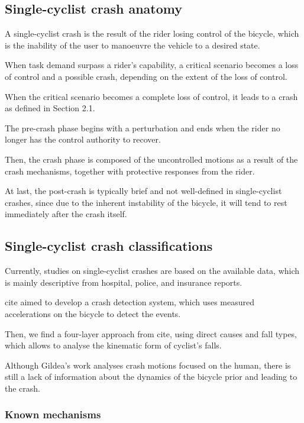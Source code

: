 \documentclass{article}
\begin{document}
\subsection{Single-cyclist crash anatomy}

A single-cyclist crash is the result of the rider losing control of the bicycle, which is the inability of the user to manoeuvre the vehicle to a desired state.

When task demand surpass a rider's capability, a critical scenario becomes a loss of control and a possible crash, depending on the extent of the loss of control.

When the critical scenario becomes a complete loss of control, it leads to a crash as defined in Section 2.1.

The pre-crash phase begins with a perturbation and ends when the rider no longer has the control authority to recover.

Then, the crash phase is composed of the uncontrolled motions as a result of the crash mechanisms, together with protective responses from the rider.

At last, the post-crash is typically brief and not well-defined in single-cyclist crashes, since due to the inherent instability of the bicycle, it will tend to rest immediately after the crash itself.


\subsection{Single-cyclist crash classifications}

Currently, studies on single-cyclist crashes are based on the available data, which is mainly descriptive from hospital, police, and insurance reports.

cite{} aimed to develop a crash detection system, which uses measured accelerations on the bicycle to detect the events.

Then, we find a four-layer approach from cite{}, using direct causes and fall types, which allows to analyse the kinematic form of cyclist’s falls. 

Although Gildea’s work analyses crash motions focused on the human, there is still a lack of information about the dynamics of the bicycle prior and leading to the crash.


\subsubsection{Known mechanisms}
\end{document}
